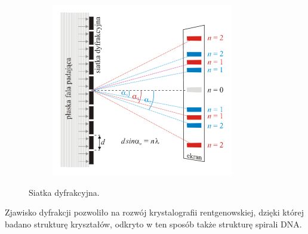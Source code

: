\begin{figure} [H]
	\centering
	\begin{subfigure}{.99\textwidth}
		\centering
		\includegraphics[width=0.6\linewidth]{generalIssues/Figures/diffraction3.png}
	\end{subfigure}
	\caption{Siatka dyfrakcyjna.}
	\label{diffracion3}
\end{figure}

Zjawisko dyfrakcji pozwoliło na rozwój krystalografii rentgenowskiej, dzięki której badano strukturę kryształów, odkryto w ten sposób także strukturę spirali DNA. 